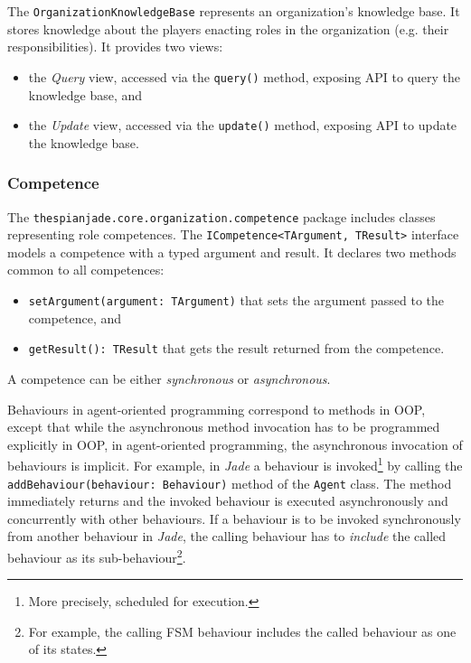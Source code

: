 The \texttt{OrganizationKnowledgeBase} represents an organization's knowledge base.
It stores knowledge about the players enacting roles in the organization (e.g. their responsibilities).
It provides two views:
\begin{itemize}
	\item the \textit{Query} view, accessed via the \texttt{query()} method, exposing API to query the knowledge base, and
	\item the \textit{Update} view, accessed via the \texttt{update()} method, exposing API to update the knowledge base.
\end{itemize}

\subsubsection{Competence}

The \texttt{thespianjade.core.organization.competence} package includes classes representing role competences.
The \texttt{ICompetence<TArgument, TResult>} interface models a competence with a typed argument and result.
It declares two methods common to all competences:
\begin{itemize}
	\item \texttt{setArgument(argument: TArgument)} that sets the argument passed to the competence, and
	\item \texttt{getResult(): TResult} that gets the result returned from the competence.
\end{itemize}

A competence can be either \textit{synchronous} or \textit{asynchronous}.

Behaviours in agent-oriented programming correspond to methods in OOP, except that while the asynchronous method invocation has to be programmed explicitly in OOP, in agent-oriented programming, the asynchronous invocation of behaviours is implicit.
For example, in \textit{Jade} a behaviour is invoked\footnote{More precisely, scheduled for execution.} by calling the \texttt{addBehaviour(behaviour: Behaviour)} method of the \texttt{Agent} class.
The method immediately returns and the invoked behaviour is executed asynchronously and concurrently with other behaviours.
If a behaviour is to be invoked synchronously from another behaviour in \textit{Jade}, the calling behaviour has to \textit{include} the called behaviour as its sub-behaviour\footnote{For example, the calling FSM behaviour includes the called behaviour as one of its states.}.

